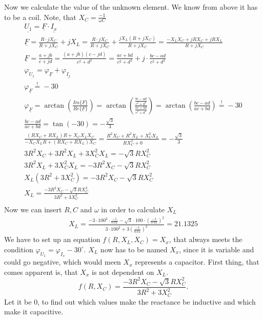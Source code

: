 \documentclass[a4paper]{article}
\begin{document}
Now we calculate the value of the unknown element. We know from above it has to be a coil.
Note, that $X_C = \frac{-1}{\omega C}$
\begin{align*}
	\underline{U_1} = \underline{F} \cdot \underline{I_x}\\
	\underline{F} = \frac{R \cdot jX_C}{R + jX_C} + jX_L =
	\frac{R \cdot jX_C}{R + jX_C} + \frac{jX_L(R+jX_C)}{R + jX_C} = \frac{-X_LX_C + jRX_C + jRX_L}{R + jX_C}\\
	\underline{F} = \frac{a+jb}{c+jd} = \frac{(a+jb)(c-jd)}{c^2+d^2} = \frac{ac+bd}{c^2+d^2} + j\cdot\frac{bc-ad}{c^2+d^2}\\
	\varphi_{\underline{U_1}} = \varphi_{\underline{F}} + \varphi_{\underline{I_x}}\\
	\varphi_{\underline{F}} \overset{!}{=} -30\\
	\varphi_{\underline{F}} = \arctan \left(\frac{Im\{\underline{F}\}}{Re\{\underline{F}\}} \right) =
	\arctan \left(\frac{\frac{bc-ad}{c^2+d^2}}{\frac{ac+bd}{c^2+d^2}} \right) =
	\arctan \left(\frac{bc-ad}{ac+bd} \right) \overset{!}{=} -30\\
	\frac{bc-ad}{ac+bd} = \tan(-30) = -\frac{\sqrt{3}}{3}\\
	\frac{(RX_C+RX_L)R + X_CX_LX_C}{-X_CX_LR + (RX_C + RX_L)X_C} = 
	\frac{R^2X_C + R^2X_L + X_C^2X_L}{RX_C^2 + 0} = -\frac{\sqrt{3}}{3}\\
	3R^2X_C + 3R^2X_L + 3X_C^2X_L = -\sqrt{3}RX_C^2\\
	3R^2X_L + 3X_C^2X_L = -3R^2X_C -\sqrt{3}RX_C^2\\
	X_L(3R^2 + 3X_C^2) = -3R^2X_C -\sqrt{3}RX_C^2\\
	X_L = \frac{-3R^2X_C -\sqrt{3}RX_C^2}{3R^2 + 3X_C^2}\\
\end{align*}
Now we can insert $R, C$ and $\omega$ in order to calculate $X_L$
\begin{align*}
	X_L = \frac{-3 \cdot 100^2 \cdot \frac{-1}{0.01} -\sqrt{3} \cdot 100 \cdot \left(\frac{-1}{0.01}\right)^2}
	{3\cdot 100^2 + 3\left(\frac{-1}{0.01}\right)^2} = 21.1325
\end{align*}
\clearpage
We have to set up an equation $f(R, X_{L}, X_{C}) = X_x$, that always meets the condition
$\varphi_{U_{1}} = \varphi_{I_{x}} - 30^{\circ}$. $X_L$ now has to be named  $X_{x}$, since it is
variable and could go negative, which would meen $X_{x}$ represents a capacitor. First thing, that
comes apparent is, that $X_{x}$ is not dependent on $X_{L}$.
\[
  f(R, X_{C}) =  \frac{-3R^2X_C -\sqrt{3}RX_C^2}{3R^2 + 3X_C^2} 
.\] 
Let it be $0$, to find out which values make the reactance be inductive and which make it
capacitive. 
\end{document}
